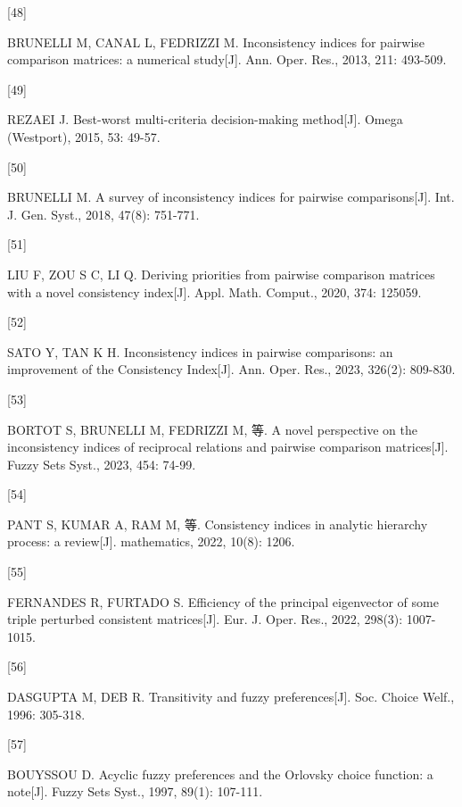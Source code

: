 \documentclass[
  letterpaper,
  DIV=11,
  numbers=noendperiod]{scrartcl}
\newlength{\cslhangindent}
\newlength{\csllabelwidth}
\newenvironment{CSLReferences}[2] %
 {\begin{list}{}{%
  \setlength{\itemindent}{0pt}
  \setlength{\leftmargin}{0pt}
  \setlength{\parsep}{0pt}
  \ifodd #1
   \setlength{\leftmargin}{\cslhangindent}
   \setlength{\itemindent}{-1\cslhangindent}
  \fi
  \setlength{\itemsep}{#2\baselineskip}}}
 {\end{list}}
\newcommand{\CSLLeftMargin}[1]{\parbox[t]{\csllabelwidth}{\strut#1\strut}}
\newcommand{\CSLRightInline}[1]{\parbox[t]{\linewidth - \csllabelwidth}{\strut#1\strut}}
\begin{document}
\begin{CSLReferences}{0}{0}
\CSLLeftMargin{{[}48{]} }%
\CSLRightInline{BRUNELLI M, CANAL L, FEDRIZZI M. Inconsistency indices
for pairwise comparison matrices: a numerical study{[}J{]}. Ann. Oper.
Res., 2013, 211: 493-509.}

\CSLLeftMargin{{[}49{]} }%
\CSLRightInline{REZAEI J. Best-worst multi-criteria decision-making
method{[}J{]}. Omega (Westport), 2015, 53: 49-57.}

\CSLLeftMargin{{[}50{]} }%
\CSLRightInline{BRUNELLI M. A survey of inconsistency indices for
pairwise comparisons{[}J{]}. Int. J. Gen. Syst., 2018, 47(8): 751-771.}

\CSLLeftMargin{{[}51{]} }%
\CSLRightInline{LIU F, ZOU S C, LI Q. Deriving priorities from pairwise
comparison matrices with a novel consistency index{[}J{]}. Appl. Math.
Comput., 2020, 374: 125059.}

\CSLLeftMargin{{[}52{]} }%
\CSLRightInline{SATO Y, TAN K H. Inconsistency indices in pairwise
comparisons: an improvement of the Consistency Index{[}J{]}. Ann. Oper.
Res., 2023, 326(2): 809-830.}

\CSLLeftMargin{{[}53{]} }%
\CSLRightInline{BORTOT S, BRUNELLI M, FEDRIZZI M, 等. A novel
perspective on the inconsistency indices of reciprocal relations and
pairwise comparison matrices{[}J{]}. Fuzzy Sets Syst., 2023, 454:
74-99.}

\CSLLeftMargin{{[}54{]} }%
\CSLRightInline{PANT S, KUMAR A, RAM M, 等. Consistency indices in
analytic hierarchy process: a review{[}J{]}. mathematics, 2022, 10(8):
1206.}

\CSLLeftMargin{{[}55{]} }%
\CSLRightInline{FERNANDES R, FURTADO S. Efficiency of the principal
eigenvector of some triple perturbed consistent matrices{[}J{]}. Eur. J.
Oper. Res., 2022, 298(3): 1007-1015.}

\CSLLeftMargin{{[}56{]} }%
\CSLRightInline{DASGUPTA M, DEB R. Transitivity and fuzzy
preferences{[}J{]}. Soc. Choice Welf., 1996: 305-318.}

\CSLLeftMargin{{[}57{]} }%
\CSLRightInline{BOUYSSOU D. Acyclic fuzzy preferences and the Orlovsky
choice function: a note{[}J{]}. Fuzzy Sets Syst., 1997, 89(1): 107-111.}


\end{CSLReferences}
\end{document}
